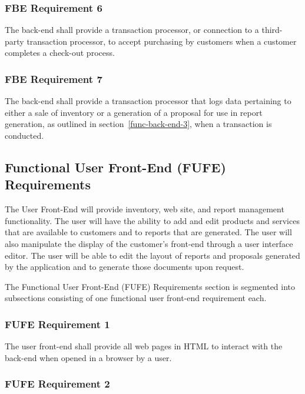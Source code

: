 \documentclass{article}
\begin{document}
\subsubsection{FBE Requirement 6}
\label{func-back-end-6}

The back-end shall provide a transaction processor, or connection to a
third-party transaction processor, to accept purchasing by customers
when a customer completes a check-out process.

\subsubsection{FBE Requirement 7}
\label{func-back-end-7}

The back-end shall provide a transaction processor that logs data pertaining
to either a sale of inventory or a generation of a proposal for use in report
generation, as outlined in section~\ref{func-back-end-3}, when a transaction
is conducted.

\pagebreak
\subsection{Functional User Front-End (FUFE) Requirements}

The User Front-End will provide inventory, web site, and report management
functionality.  The user will have the ability to add and edit products and
services that are available to customers and to reports that are generated.  The
user will also manipulate the display of the customer's front-end through a
user interface editor.  The user will be able to edit the layout of reports and
proposals generated by the application and to generate those documents upon
request.

The Functional User Front-End (FUFE) Requirements section is segmented into
subsections consisting of one functional user front-end requirement each.

\subsubsection{FUFE Requirement 1}
\label{func-user-front-end-1}

The user front-end shall provide all web pages in HTML to interact with the
back-end when opened in a browser by a user.

\subsubsection{FUFE Requirement 2}
\label{func-user-front-end-2}
\end{document}

